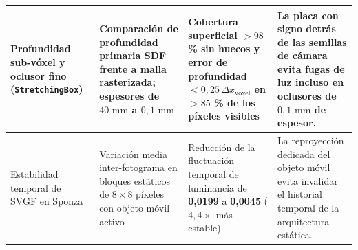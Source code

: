 \begin{table}[htbp]
\begin{tabularx}{\textwidth}{|>{\bfseries\raggedright\arraybackslash}p{33mm}|>{\raggedright\arraybackslash}p{35mm}|>{\raggedright\arraybackslash}p{35mm}|>{\raggedright\arraybackslash}X|}
    Profundidad sub-vóxel y oclusor fino (\texttt{StretchingBox}) & Comparación de profundidad primaria SDF frente a malla rasterizada; espesores de $40\text{ mm}$ a $0,1\text{ mm}$ & Cobertura superficial $> 98$ \% sin huecos y error de profundidad $< 0,25\,\Delta x_{\text{vóxel}}$ en $> 85$ \% de los píxeles visibles & La placa con signo detrás de las semillas de cámara evita fugas de luz incluso en oclusores de $0,1\text{ mm}$ de espesor. \\ \hline
    Estabilidad temporal de SVGF en Sponza & Variación media inter-fotograma en bloques estáticos de $8\times 8$ píxeles con objeto móvil activo & Reducción de la fluctuación temporal de luminancia de \textbf{0,0199} a \textbf{0,0045} ($4,4\times$ más estable) & La reproyección dedicada del objeto móvil evita invalidar el historial temporal de la arquitectura estática. \\ \hline
  \end{tabularx}
\end{table}
